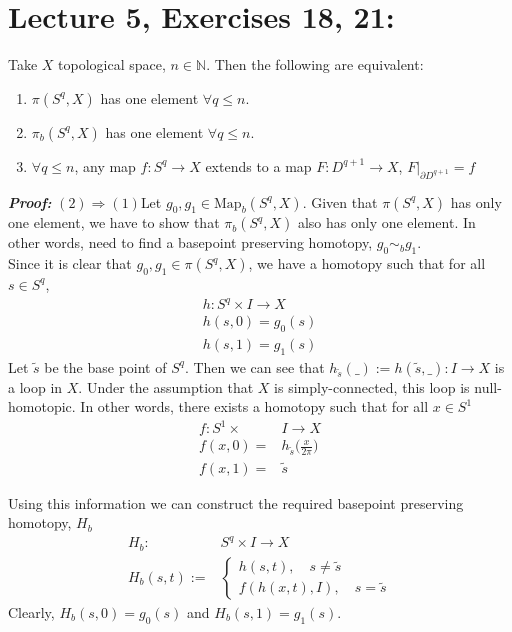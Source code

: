 \documentclass[11pt]{article}
\numberwithin{equation}{section}
\begin{document}
\section{\normalsize{Lecture 5, Exercises 18, 21:}}
\begin{clm}
     Take $X$ topological space, $n\in \mathbb{N}$. Then the following are equivalent:
     \begin{enumerate}
          \item $\pi(S^q,X)$ has one element $\forall q\leqslant n$.
          \item $\pi_b(S^q,X)$ has one element $\forall q\leqslant n$.
          \item $\forall q\leqslant n$, any map $f:S^q\rightarrow X$ extends to a map $F:D^{q+1}\rightarrow X$, $F|_{\partial D^{q+1}}=f$
     \end{enumerate}
\end{clm}
\textbf{\emph{Proof:}}
$\mathit{(2)\Rightarrow(1)}$Let $g_0, g_1 \in \text{Map}_b(S^q,X)$. Given that $\pi(S^q, X)$ has only one element, we have to show that $\pi_b(S^q,X)$ also has only one element. In other words, need to find a basepoint preserving homotopy, $g_0\sim_b g_1$.\\
Since it is clear that $g_0, g_1\in\pi(S^q,X)$, we have a homotopy such that for all $s\in S^q$,
\begin{equation}
	\begin{aligned}
	h:S^q\times I\rightarrow X\nonumber\\
	h(s, 0)=g_0(s)\nonumber\\
	h(s, 1)=g_1(s) 
	\end{aligned}
\end{equation}
Let $\tilde{s}$ be the base point of $S^q$. Then we can see that $h_{\tilde{s}}(\_):=h(\tilde{s},\_):I\rightarrow X$ is a loop in $X$. Under the assumption that $X$ is simply-connected, this loop is null-homotopic. In other words, there exists a homotopy such that for all $x\in S^1$
\begin{equation}
	\begin{aligned}
		f:S^1\times& I\rightarrow X\nonumber\\
		f(x, 0)=&h_{\tilde{s}}\Big(\frac{x}{2\pi}\Big)\nonumber\\
		f(x, 1)=&\tilde{s}
	\end{aligned}
\end{equation}

Using this information we can construct the required basepoint preserving homotopy, $H_b$
\begin{equation}
	\begin{aligned}
	H_b:&S^q\times I\rightarrow X\nonumber\\
	H_b(s,t):=&\begin{cases}
	h(s, t), \quad s\ne\tilde{s}\\
	f(h(x, t), I), \quad s=\tilde{s}
	\end{cases}
	\end{aligned}
\end{equation}
Clearly, $H_b(s, 0)=g_0(s)$ and $H_b(s, 1)=g_1(s)$.
\end{document}
